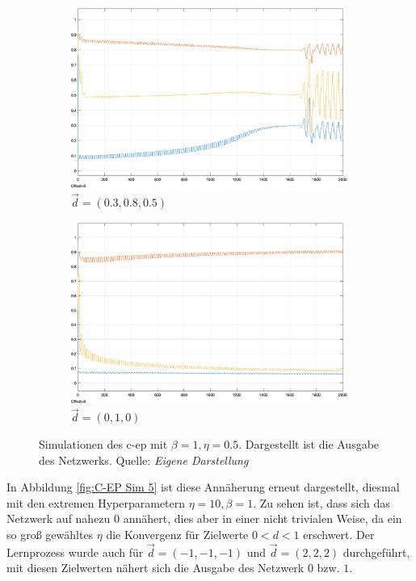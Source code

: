 \begin{figure}[h]
  \centering
  \begin{subfigure}[b]{0.5\textwidth}
    \includegraphics[width=\textwidth]{abbildungen/c_ep_sim_1_ausgabe.png}
    \caption{\(\vec{d}=(0.3,0.8,0.5)\)}
  \end{subfigure}%
  \hfill
  \begin{subfigure}[b]{0.5\textwidth}
    \includegraphics[width=\textwidth]{abbildungen/c_ep_sim_2_ausgabe.png}
    \caption{\(\vec{d}=(0,1,0)\)}
  \end{subfigure}
  \caption{Simulationen des \gls{c-ep} mit \(\beta=1,\eta=0.5\). Dargestellt ist die Ausgabe des Netzwerks. Quelle: \textit{Eigene Darstellung}}
  \label{fig:C-EP Sim 1,2}
\end{figure}

In Abbildung \ref{fig:C-EP Sim 5} ist diese Annäherung erneut dargestellt, diesmal mit den extremen Hyperparametern \(\eta=10,\beta=1\). Zu sehen ist, dass sich das Netzwerk auf nahezu \(0\) annähert, dies aber in einer nicht trivialen Weise, da ein so groß gewähltes \(\eta\) die Konvergenz für Zielwerte \(0<d<1\) erschwert. Der Lernprozess wurde auch für \(\vec{d}=(-1,-1,-1)\) und \(\vec{d}=(2,2,2)\) durchgeführt, mit diesen Zielwerten nähert sich die Ausgabe des Netzwerk \(0\) bzw. \(1\).

